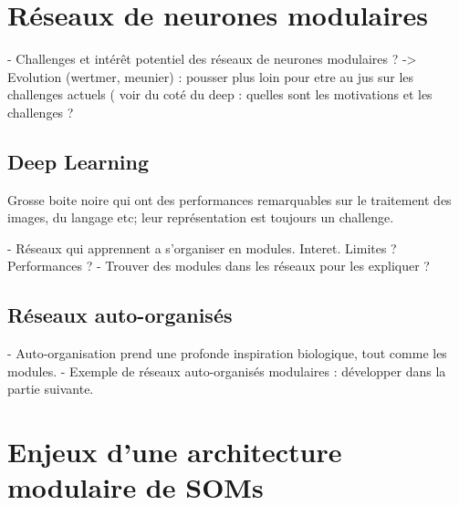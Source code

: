 \section{Réseaux de neurones modulaires}

- Challenges et intérêt potentiel des réseaux de neurones modulaires ? -> Evolution (wertmer, meunier) : pousser plus loin pour etre au jus sur les challenges actuels ( voir du coté du deep : quelles sont les motivations et les challenges ? 

\subsection{Deep Learning}
Grosse boite noire qui ont des performances remarquables sur le traitement des images, du langage etc; leur représentation est toujours un challenge.

- Réseaux qui apprennent a s'organiser en modules. Interet. Limites ? Performances ?
- Trouver des modules dans les réseaux pour les expliquer ? 

\subsection{Réseaux auto-organisés}

- Auto-organisation prend une profonde inspiration biologique, tout comme les modules.
- Exemple de réseaux auto-organisés modulaires : développer dans la partie suivante. 

\section{Enjeux d'une architecture modulaire de SOMs}




